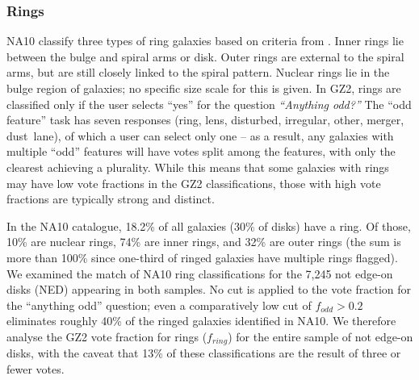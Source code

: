 \documentclass[useAMS,usenatbib]{mn2e}
\begin{document}


\subsubsection{Rings}

NA10 classify three types of ring galaxies based on criteria from \citet{but96}. Inner rings lie between the bulge and spiral arms or disk. Outer rings are external to the spiral arms, but are still closely linked to the spiral pattern. Nuclear rings lie in the bulge region of galaxies; no specific size scale for this is given. In GZ2, rings are classified only if the user selects ``yes'' for the question {\it ``Anything odd?''} The ``odd feature'' task has seven responses (ring, lens, disturbed, irregular, other, merger, dust~lane), of which a user can select only one -- as a result, any galaxies with multiple ``odd'' features will have votes split among the features, with only the clearest achieving a plurality. While this means that some galaxies with rings may have low vote fractions in the GZ2 classifications, those with high vote fractions are typically strong and distinct.

In the NA10 catalogue, 18.2\% of all galaxies (30\% of disks) have a ring. Of those, 10\% are nuclear rings, 74\% are inner rings, and 32\% are outer rings (the sum is more than 100\% since one-third of ringed galaxies have multiple rings flagged). We examined the match of NA10 ring classifications for the 7,245 not edge-on disks (NED) appearing in both samples. No cut is applied to the vote fraction for the ``anything odd'' question; even a comparatively low cut of $f_{odd}>0.2$ eliminates roughly 40\% of the ringed galaxies identified in NA10. We therefore analyse the GZ2 vote fraction for rings ($f_{ring}$) for the entire sample of not edge-on disks, with the caveat that 13\% of these classifications are the result of three or fewer votes.
\end{document}

